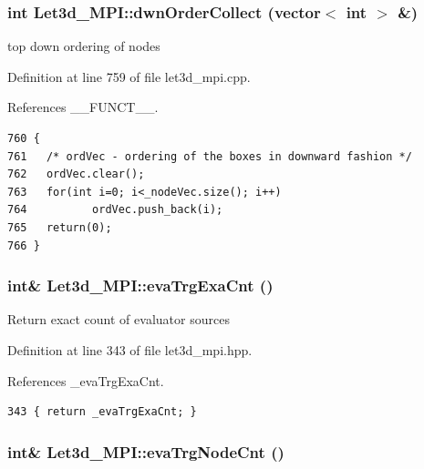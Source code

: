 \subsubsection{\setlength{\rightskip}{0pt plus 5cm}int Let3d\_\-MPI::dwn\-Order\-Collect (vector$<$ int $>$ \&)}\label{classLet3d__MPI_1917ece529ea97f12e74e56e42b6d15a_1917ece529ea97f12e74e56e42b6d15a}


top down ordering of nodes 

Definition at line 759 of file let3d\_\-mpi.cpp.

References \_\-\_\-FUNCT\_\-\_\-.

\footnotesize\begin{verbatim}760 {
761   /* ordVec - ordering of the boxes in downward fashion */
762   ordVec.clear();
763   for(int i=0; i<_nodeVec.size(); i++)
764          ordVec.push_back(i);
765   return(0);
766 }
\end{verbatim}\normalsize 


\subsubsection{\setlength{\rightskip}{0pt plus 5cm}int\& Let3d\_\-MPI::eva\-Trg\-Exa\-Cnt ()\hspace{0.3cm}{\tt  [inline]}}\label{classLet3d__MPI_6d41ef754b4e311871e69d7b1056ba1c_6d41ef754b4e311871e69d7b1056ba1c}


Return exact count of evaluator sources 

Definition at line 343 of file let3d\_\-mpi.hpp.

References \_\-eva\-Trg\-Exa\-Cnt.

\footnotesize\begin{verbatim}343 { return _evaTrgExaCnt; }
\end{verbatim}\normalsize 


\subsubsection{\setlength{\rightskip}{0pt plus 5cm}int\& Let3d\_\-MPI::eva\-Trg\-Node\-Cnt ()\hspace{0.3cm}{\tt  [inline]}}\label{classLet3d__MPI_1999041d0ab14495560e04632d9b5707_1999041d0ab14495560e04632d9b5707}


